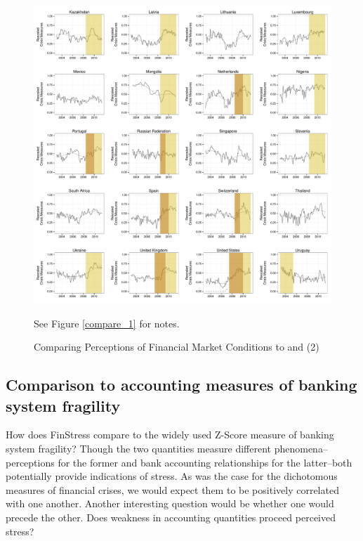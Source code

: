 \documentclass[]{article}
\begin{document}
\begin{figure}
    \caption{Comparing Perceptions of Financial Market Conditions to \cite{laeven2013} and \cite{Reinhart2009} (2)}
    \label{compare_2}
    \begin{center}
        \includegraphics[scale=0.4]{figures/compare_to_lv_rr_2.pdf}
    \end{center}

    {\tiny{See Figure \ref{compare_1} for notes.}}
\end{figure}

\subsection{Comparison to accounting measures of banking system fragility}

How does FinStress compare to the widely used Z-Score measure of banking system fragility? Though the two quantities measure different phenomena--perceptions for the former and bank accounting relationships for the latter--both potentially  provide indications of stress. As was the case for the dichotomous measures of financial crises, we would expect them to be positively correlated with one another. Another interesting question would be whether one would precede the other. Does weakness in accounting quantities proceed perceived stress?
\end{document}
